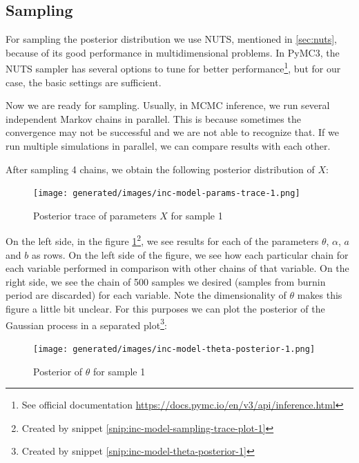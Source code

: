 \documentclass[
  digital, %
  oneside, %
  lof,     %
  lot,     %
]{fithesis4}
\begin{document}
\subsection{Sampling}

For sampling the posterior distribution we use NUTS, mentioned
in \autoref{sec:nuts}, because of its good performance 
in multidimensional problems.
In PyMC3, the NUTS sampler has several options
to tune for better performance\footnote{See official documentation \url{https://docs.pymc.io/en/v3/api/inference.html}}, but for our case, the
basic settings are sufficient.

Now we are ready for sampling.
Usually, in MCMC inference, we run several independent
Markov chains in parallel.
This is because sometimes the convergence may not be 
successful and we are not able to recognize that.
If we run multiple simulations in parallel,
we can compare results with each other.

After sampling 4 chains, we obtain the following posterior
distribution of $X$:

\begin{figure}[H]
  \begin{center}
    \texttt{[image: generated/images/inc-model-params-trace-1.png]}
  \end{center}
  \caption{Posterior trace of parameters $X$ for sample 1}
  \label{fig:params-trace-1}
\end{figure}

On the left side, in the figure \ref{fig:params-trace-1}\footnote{Created by snippet \ref{snip:inc-model-sampling-trace-plot-1}},
we see results for each of the parameters 
$\theta$, $\alpha$, $a$ and $b$ as rows.
On the left side of the figure, we see how each 
particular chain for each variable performed in 
comparison with other chains of that variable.
On the right side, we see the chain of 500 samples 
we desired (samples from burnin period are discarded) for 
each variable.
Note the dimensionality of $\theta$ makes this 
figure a little bit unclear.
For this purposes we can plot the posterior of 
the Gaussian process in a separated plot\footnote{Created by snippet \ref{snip:inc-model-theta-posterior-1}}:

\begin{figure}[H]
  \begin{center}
    \texttt{[image: generated/images/inc-model-theta-posterior-1.png]}
  \end{center}
  \caption{Posterior of $\theta$ for sample 1}
  \label{fig:theta-posterior-1}
\end{figure}
\end{document}
